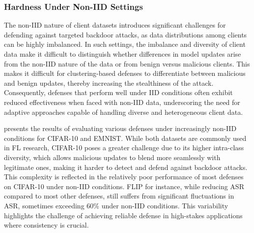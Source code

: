 \begin{table*}[th]
\begin{tabular}{l|cccc|cccc|cccc|cccc}
    \bottomrule
    \end{tabular}
    \caption{MTA and ASR across rounds for various defenses for non-IID data with varying $Dir(\alpha)$, for 1.25\% DPR and 20\% MCR, using configuration C4 for CIFAR-10  and C9 for EMNIST. FLAME fluctuates wildly and often ends up with models that have not learned anything effectively, leading to random-guess MTA (\textcolor{red}{red}) and consequently, zero ASR. Results for FLIP are shown only for $Dir(\alpha) = 1$ due to its extreme computational overhead, as the method requires adversarial training for each client at every round. As observed, DROP is the most resilient defense on EMNIST and all  defenses  struggle  on the more complex CIFAR-10 learning task.
    }
    \label{tab:noniid}
\end{table*}


\subsubsection{Hardness Under Non-IID Settings}
The non-IID nature of client datasets introduces significant challenges for defending against targeted backdoor attacks, as data distributions among clients can be highly imbalanced. In such settings, the imbalance and diversity of client data make it difficult to distinguish whether differences in model updates arise from the non-IID nature of the data or from benign versus malicious clients. This makes it difficult for clustering-based defenses to differentiate between malicious and benign updates, thereby increasing the stealthiness of the attack. Consequently, defenses that perform well under IID conditions often exhibit reduced effectiveness when faced with non-IID data, underscoring the need for adaptive approaches capable of handling diverse and heterogeneous client data.

 presents the results of evaluating various defenses under increasingly non-IID conditions for CIFAR-10 and EMNIST. While both datasets are commonly used in FL research, CIFAR-10 poses a greater challenge due to its higher intra-class diversity, which allows malicious updates to blend more seamlessly with legitimate ones, making it harder to detect and defend against backdoor attacks. This complexity is reflected in the relatively poor performance of most defenses on CIFAR-10 under non-IID conditions. FLIP for instance, while reducing ASR compared to most other defenses, still suffers from significant fluctuations in ASR, sometimes exceeding 60\% under non-IID conditions. This variability highlights the challenge of achieving reliable defense in high-stakes applications where consistency is crucial. 

